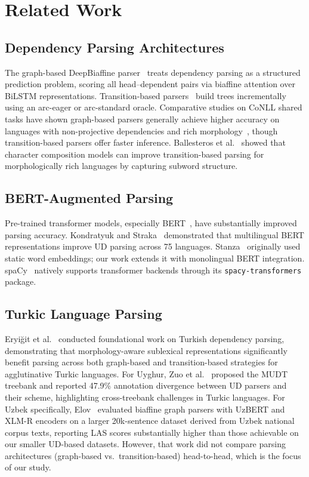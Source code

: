 \documentclass[10pt,conference,a4paper]{IEEEtran_EDM}
\begin{document}
\section{Related Work}

\subsection{Dependency Parsing Architectures}

The graph-based DeepBiaffine parser~\cite{dozat2017deep} treats dependency parsing as a structured prediction problem, scoring all head--dependent pairs via biaffine attention over BiLSTM representations. Transition-based parsers~\cite{nivre2008algorithms} build trees incrementally using an arc-eager or arc-standard oracle. Comparative studies on CoNLL shared tasks have shown graph-based parsers generally achieve higher accuracy on languages with non-projective dependencies and rich morphology~\cite{de2017raw}, though transition-based parsers offer faster inference. Ballesteros et al.~\cite{ballesteros2015improved} showed that character composition models can improve transition-based parsing for morphologically rich languages by capturing subword structure.

\subsection{BERT-Augmented Parsing}

Pre-trained transformer models, especially BERT~\cite{devlin2019bert}, have substantially improved parsing accuracy. Kondratyuk and Straka~\cite{kondratyuk2019cross} demonstrated that multilingual BERT representations improve UD parsing across 75 languages. Stanza~\cite{qi2020stanza} originally used static word embeddings; our work extends it with monolingual BERT integration. spaCy~\cite{honnibal2020spacy} natively supports transformer backends through its \texttt{spacy-transformers} package.

\subsection{Turkic Language Parsing}

Eryiğit et al.~\cite{eryigit2008dependency} conducted foundational work on Turkish dependency parsing, demonstrating that morphology-aware sublexical representations significantly benefit parsing across both graph-based and transition-based strategies for agglutinative Turkic languages. For Uyghur, Zuo et al.~\cite{zuo2025mudt} proposed the MUDT treebank and reported 47.9\% annotation divergence between UD parsers and their scheme, highlighting cross-treebank challenges in Turkic languages. For Uzbek specifically, Elov~\cite{elov2025methods} evaluated biaffine graph parsers with UzBERT and XLM-R encoders on a larger 20k-sentence dataset derived from Uzbek national corpus texts, reporting LAS scores substantially higher than those achievable on our smaller UD-based datasets. However, that work did not compare parsing architectures (graph-based vs.\ transition-based) head-to-head, which is the focus of our study.
\end{document}

